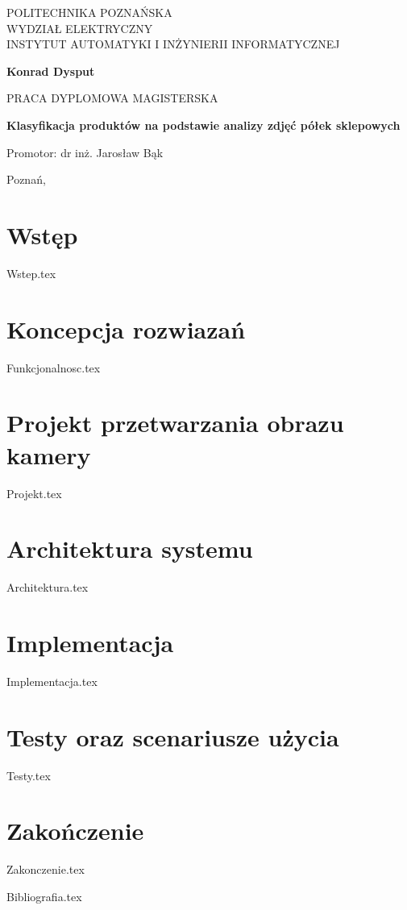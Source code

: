 \documentclass[12pt,a4paper,leqno,oneside,titlepage]{mwrep}
\begin{document}
\begin{titlepage}
\begin{center}
{\large POLITECHNIKA POZNAŃSKA\\ WYDZIAŁ ELEKTRYCZNY\\ INSTYTUT AUTOMATYKI I INŻYNIERII INFORMATYCZNEJ\par}
\end{center}
\vspace{1.5cm plus 1fill}
\begin{center}
{\bf \Large Konrad Dysput\par}
\end{center}
\vspace{1.5cm plus 1mm minus 2mm}
\begin{center}
{\large PRACA DYPLOMOWA MAGISTERSKA\par}
\end{center}
\vspace{1.5cm plus 1mm minus 2mm}
\begin{center}
{\huge\textbf{Klasyfikacja produktów na podstawie analizy zdjęć półek sklepowych }\par}
\vspace{1.5cm plus 1.5fill}
\begin{flushright}
{\large Promotor: dr inż. Jarosław Bąk}
\end{flushright}
\vspace{4cm plus .1fill}
{\large Poznań,\par}
\end{center}
\end{titlepage}

\tableofcontents

\chapter{Wstęp}
{Wstep.tex}

\chapter{Koncepcja rozwiazań}
{Funkcjonalnosc.tex}

\chapter{Projekt przetwarzania obrazu kamery}
{Projekt.tex}

\chapter{Architektura systemu}
{Architektura.tex}

\chapter{Implementacja}
{Implementacja.tex}

\chapter{Testy oraz scenariusze użycia}
{Testy.tex}

\chapter{Zakończenie}
{Zakonczenie.tex}

{Bibliografia.tex}
\end{document}
